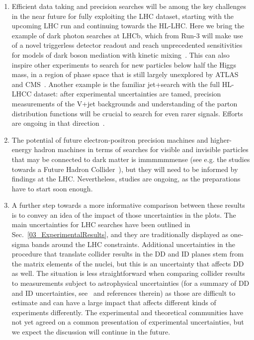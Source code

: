 \begin{issues}
\begin{enumerate}
\begin{itemize}

\end{itemize} 

\item Efficient data taking and precision searches will be among the key challenges in the near future for fully exploiting the LHC dataset, starting with the upcoming LHC run and continuing towards the HL-LHC. Here we bring the example of dark photon searches at LHCb, which from Run-3 will make use of a novel triggerless detector readout and reach unprecedented sensitivities for models of dark boson mediation with kinetic mixing~\cite{Ilten:2016tkc}. This can also inspire other experiments to search for new particles below half the Higgs mass, in a region of phase space that is still largely unexplored by ATLAS and CMS~\cite{Alves:2016cqf}. Another example is the familiar jet+\X search with the full HL-LHCC dataset: after experimental uncertainties are tamed, precision measurements of the V+jet backgrounds and understanding of the parton distribution functions will be crucial to search for even rarer signals. Efforts are ongoing in that direction~\cite{Blumenschein:2018gtm}. 


\item The potential of future electron-positron precision machines and higher-energy hadron machines in terms of searches for visible and invisible particles that may be connected to dark matter is immmmmmense (see e.g. the studies towards a Future Hadron Collider~\cite{Golling:2016gvc}), but they will need to be informed by findings at the LHC. Nevertheless, studies are ongoing, as the preparations have to start soon enough. 

\item A further step towards a more informative comparison between these results is to convey an idea of the impact of those uncertainties in the plots. 
The main uncertainties for LHC searches have been outlined in Sec.~\ref{03_ExperimentalResults}, and they are traditionally displayed as one-sigma bands around the LHC constraints. 
Additional uncertainties in the procedure that translate collider results in the DD and ID planes stem from the matrix elements of the nuclei, but this is an uncertainty that affects DD as well. %
The situation is less straightforward when comparing collider results to measurements subject to astrophysical uncertainties (for a summary of DD and ID uncertainties, see~\cite{Feldstein:2014ufa,d300ef23986a49099715e661295a4d72} and references therein) as those are difficult to estimate and can have a large impact that affects different kinds of experiments differently. 
The experimental and theoretical communities have not yet agreed on a common presentation of experimental uncertainties, but we expect the discussion will continue in the future. 


\end{enumerate}
\end{issues}
